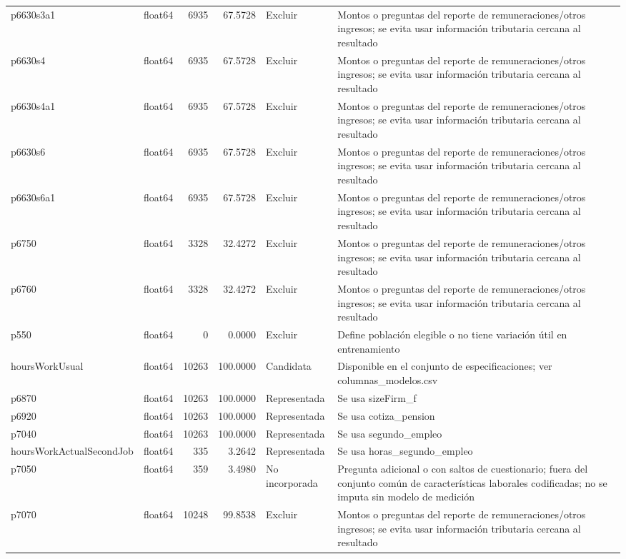 \begin{longtable}{llrrll}
p6630s3a1 & float64 & 6935 & 67.5728 & Excluir & Montos o preguntas del reporte de remuneraciones/otros ingresos; se evita usar información tributaria cercana al resultado \\
p6630s4 & float64 & 6935 & 67.5728 & Excluir & Montos o preguntas del reporte de remuneraciones/otros ingresos; se evita usar información tributaria cercana al resultado \\
p6630s4a1 & float64 & 6935 & 67.5728 & Excluir & Montos o preguntas del reporte de remuneraciones/otros ingresos; se evita usar información tributaria cercana al resultado \\
p6630s6 & float64 & 6935 & 67.5728 & Excluir & Montos o preguntas del reporte de remuneraciones/otros ingresos; se evita usar información tributaria cercana al resultado \\
p6630s6a1 & float64 & 6935 & 67.5728 & Excluir & Montos o preguntas del reporte de remuneraciones/otros ingresos; se evita usar información tributaria cercana al resultado \\
p6750 & float64 & 3328 & 32.4272 & Excluir & Montos o preguntas del reporte de remuneraciones/otros ingresos; se evita usar información tributaria cercana al resultado \\
p6760 & float64 & 3328 & 32.4272 & Excluir & Montos o preguntas del reporte de remuneraciones/otros ingresos; se evita usar información tributaria cercana al resultado \\
p550 & float64 & 0 & 0.0000 & Excluir & Define población elegible o no tiene variación útil en entrenamiento \\
hoursWorkUsual & float64 & 10263 & 100.0000 & Candidata & Disponible en el conjunto de especificaciones; ver columnas\_modelos.csv \\
p6870 & float64 & 10263 & 100.0000 & Representada & Se usa sizeFirm\_f \\
p6920 & float64 & 10263 & 100.0000 & Representada & Se usa cotiza\_pension \\
p7040 & float64 & 10263 & 100.0000 & Representada & Se usa segundo\_empleo \\
hoursWorkActualSecondJob & float64 & 335 & 3.2642 & Representada & Se usa horas\_segundo\_empleo \\
p7050 & float64 & 359 & 3.4980 & No incorporada & Pregunta adicional o con saltos de cuestionario; fuera del conjunto común de características laborales codificadas; no se imputa sin modelo de medición \\
p7070 & float64 & 10248 & 99.8538 & Excluir & Montos o preguntas del reporte de remuneraciones/otros ingresos; se evita usar información tributaria cercana al resultado \\

\end{longtable}
